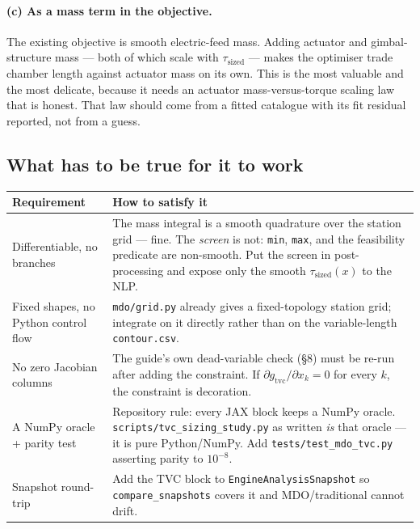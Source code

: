 \documentclass[11pt]{article}
\newcommand{\cmd}[1]{\nolinkurl{#1}}
\begin{document}
\paragraph{(c) As a mass term in the objective.} The existing objective is
smooth electric-feed mass. Adding actuator and gimbal-structure mass ---
both of which scale with $\tau_{\text{sized}}$ --- makes the optimiser trade
chamber length against actuator mass on its own. This is the most valuable
and the most delicate, because it needs an actuator mass-versus-torque
scaling law that is honest. That law should come from a fitted catalogue
with its fit residual reported, not from a guess.

\subsection{What has to be true for it to work}

\begin{table}[H]\centering\small
\begin{tabular}{@{}p{4.2cm} p{10.6cm}@{}}
\toprule
\textbf{Requirement} & \textbf{How to satisfy it}\\
\midrule
Differentiable, no branches
& The mass integral is a smooth quadrature over the station grid --- fine. The
\emph{screen} is not: \texttt{min}, \texttt{max}, and the feasibility
predicate are non-smooth. Put the screen in post-processing and expose only
the smooth $\tau_{\text{sized}}(x)$ to the NLP.\\[3pt]
Fixed shapes, no Python control flow
& \cmd{mdo/grid.py} already gives a fixed-topology station grid; integrate on
it directly rather than on the variable-length \cmd{contour.csv}.\\[3pt]
No zero Jacobian columns
& The guide's own dead-variable check (§8) must be re-run after adding the
constraint. If $\partial g_{\text{tvc}}/\partial x_k = 0$ for every $k$, the
constraint is decoration.\\[3pt]
A NumPy oracle + parity test
& Repository rule: every JAX block keeps a NumPy oracle.
\cmd{scripts/tvc\_sizing\_study.py} as written \emph{is} that oracle --- it is
pure Python/NumPy. Add \cmd{tests/test\_mdo\_tvc.py} asserting parity to
$10^{-8}$.\\[3pt]
Snapshot round-trip
& Add the TVC block to \texttt{EngineAnalysisSnapshot} so
\texttt{compare\_snapshots} covers it and MDO/traditional cannot drift.\\
\bottomrule
\end{tabular}
\end{table}
\end{document}
